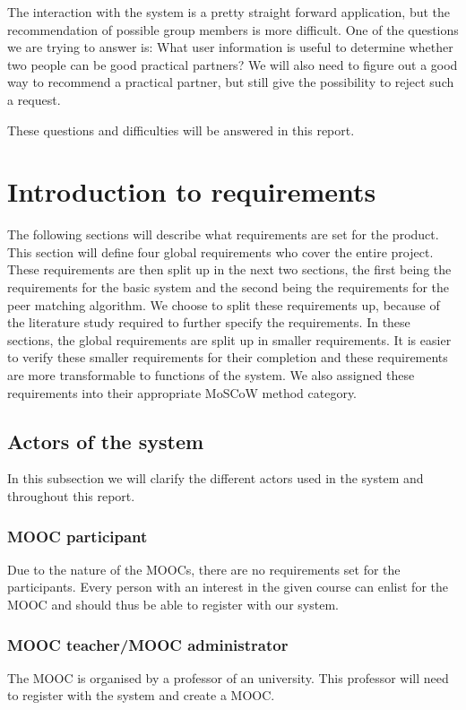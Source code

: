 \documentclass[]{article}
\begin{document}
The interaction with the system is a pretty straight forward application, but the recommendation of possible group members is more difficult.
One of the questions we are trying to answer is: What user information is useful to determine whether two people can be good practical partners?
We will also need to figure out a good way to recommend a practical partner, but still give the possibility to reject such a request.

These questions and difficulties will be answered in this report.

\section{Introduction to requirements}
The following sections will describe what requirements are set for the product.
This section will define four global requirements who cover the entire project.
These requirements are then split up in the next two sections, the first being the requirements for the basic system and the second being the requirements for the peer matching algorithm.
We choose to split these requirements up, because of the literature study required to further specify the requirements.
In these sections, the global requirements are split up in smaller requirements.
It is easier to verify these smaller requirements for their completion and these requirements are more transformable to functions of the system.
We also assigned these requirements into their appropriate MoSCoW \cite{highsmith2001agile} method category.

\subsection{Actors of the system}
In this subsection we will clarify the different actors used in the system and throughout this report.
\subsubsection{MOOC participant}
Due to the nature of the MOOCs, there are no requirements set for the participants.
Every person with an interest in the given course can enlist for the MOOC and should thus be able to register with our system.
\subsubsection{MOOC teacher/MOOC administrator} 
The MOOC is organised by a professor of an university.
This professor will need to register with the system and create a MOOC.
\end{document}
